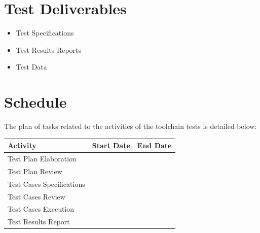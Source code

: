 \section{Test Deliverables}
\begin{itemize}
\item Test Specifications
\item Test Results Reports
\item Test Data
\end{itemize}

\section{Schedule}
The plan of tasks related to the activities of the toolchain tests is detailed below:
\begin{table}[H]
\centering
\begin{tabular}{|p{8cm}|p{3cm}|p{3cm}|}\hline
\textbf{Activity} & \textbf{Start Date} & \textbf{End Date}\\\hline
Test Plan Elaboration & & \\\hline
Test Plan Review & & \\\hline
Test Cases Specifications & & \\\hline
Test Cases Review & & \\\hline
Test Cases Execution & & \\\hline
Test Results Report & & \\\hline
\end{tabular}
\end{table}
